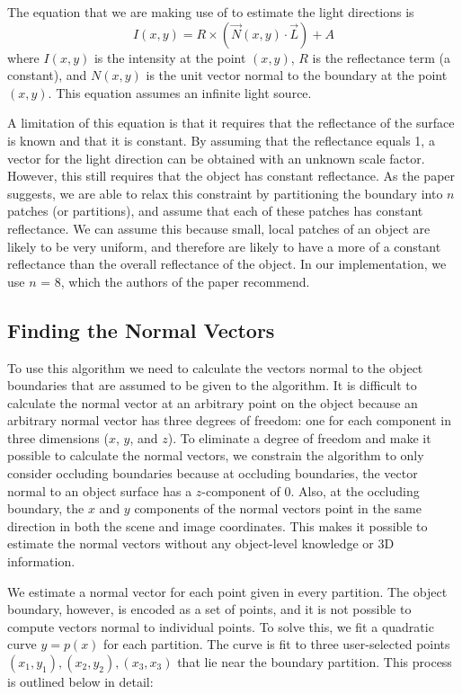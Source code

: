 \documentclass[10pt,twocolumn,letterpaper]{article}
\begin{document}
The equation that we are making use of to estimate the light directions is \[I(x,y) = R\times (\vec{N}(x,y)\cdot \vec{L}) + A\]
where $I(x,y)$ is the intensity at the point $(x,y)$, $R$ is the reflectance term (a constant), and $N(x,y)$ is the unit vector normal to the boundary at the point $(x,y)$. This equation assumes an infinite light source.

A limitation of this equation is that it requires that the reflectance of the surface is known and that it is constant. By assuming that the reflectance equals 1, a vector for the light direction can be obtained with an unknown scale factor. However, this still requires that the object has constant reflectance. As the paper suggests, we are able to relax this constraint by partitioning the boundary into $n$ patches (or partitions), and assume that each of these patches has constant reflectance. We can assume this because small, local patches of an object are likely to be very uniform, and therefore are likely to have a more of a constant reflectance than the overall reflectance of the object. In our implementation, we use $n$ = 8, which the authors of the paper recommend.

\subsection{Finding the Normal Vectors}
To use this algorithm we need to calculate the vectors normal to the object boundaries that are assumed to be given to the algorithm. It is difficult to calculate the normal vector at an arbitrary point on the object because an arbitrary normal vector has three degrees of freedom: one for each component in three dimensions ($x$, $y$, and $z$). To eliminate a degree of freedom and make it possible to calculate the normal vectors, we constrain the algorithm to only consider occluding boundaries because at occluding boundaries, the vector normal to an object surface has a $z$-component of $0$. Also, at the occluding boundary, the $x$ and $y$ components of the normal vectors point in the same direction in both the scene and image coordinates. This makes it possible to estimate the normal vectors without any object-level knowledge or 3D information. 

We estimate a normal vector for each point given in every partition. The object boundary, however, is encoded as a set of points, and it is not possible to compute vectors normal to individual points. To solve this, we fit a quadratic curve $y = p(x)$ for each partition. The curve is fit to three user-selected points $(x_1,y_1), (x_2,y_2), (x_3,x_3)$ that lie near the boundary partition. This process is outlined below in detail:
\end{document}
